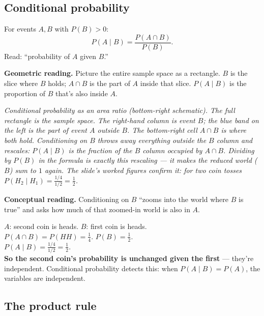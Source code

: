 \documentclass[11pt, a4paper]{article}
\begin{document}
\subsection{Conditional probability}

\begin{defbox}
For events $A, B$ with $P(B) > 0$:
\[
P(A \mid B) = \frac{P(A \cap B)}{P(B)}.
\]
Read: ``probability of $A$ given $B$.''
\end{defbox}

\textbf{Geometric reading.} Picture the entire sample space as a rectangle. $B$ is the slice where $B$ holds; $A \cap B$ is the part of $A$ inside that slice. $P(A \mid B)$ is the proportion of $B$ that's also inside $A$.

\begin{center}

\footnotesize\textit{Conditional probability as an area ratio (bottom-right schematic). The full rectangle is the sample space. The right-hand column is event $B$; the blue band on the left is the part of event $A$ outside $B$. The bottom-right cell $A \cap B$ is where both hold. Conditioning on $B$ throws away everything outside the $B$ column and rescales: $P(A \mid B)$ is the fraction of the $B$ column occupied by $A \cap B$. Dividing by $P(B)$ in the formula is exactly this rescaling — it makes the reduced world ($B$) sum to $1$ again. The slide's worked figures confirm it: for two coin tosses $P(H_2 \mid H_1) = \tfrac{1/4}{1/2} = \tfrac{1}{2}$.}
\end{center}

\textbf{Conceptual reading.} Conditioning on $B$ ``zooms into the world where $B$ is true'' and asks how much of that zoomed-in world is also in $A$.

\begin{exbox}
$A$: second coin is heads. $B$: first coin is heads.\\[0.3em]
$P(A \cap B) = P(HH) = \frac{1}{4}$. $P(B) = \frac{1}{2}$.\\[0.3em]
$P(A \mid B) = \frac{1/4}{1/2} = \frac{1}{2}$.\\[0.3em]
\textbf{So the second coin's probability is unchanged given the first} — they're independent. Conditional probability detects this: when $P(A \mid B) = P(A)$, the variables are independent.
\end{exbox}

\subsection{The product rule}
\end{document}
